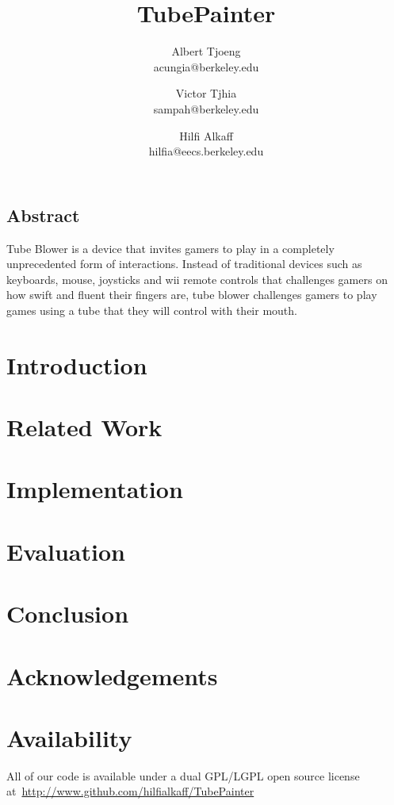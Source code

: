 \documentclass[letterpaper,twocolumn,11pt]{article}
\begin{document}
\date{}

\title{\Large \bf TubePainter}

\author{
{\rm Albert Tjoeng}\\
acungia@berkeley.edu
\and
{\rm Victor Tjhia}\\
sampah@berkeley.edu
\and
{\rm Hilfi Alkaff}\\
hilfia@eecs.berkeley.edu
} %

\maketitle


\subsection*{Abstract}
Tube Blower is a device that invites gamers to play in a completely unprecedented form of interactions. Instead of traditional devices such as keyboards, mouse, joysticks and wii remote controls that challenges gamers on how swift and fluent their fingers are, tube blower challenges gamers to play games using a tube that they will control with their mouth.

\section{Introduction}

\section{Related Work}

\section{Implementation}

\section{Evaluation}

\section{Conclusion}

\section{Acknowledgements}

\section{Availability}

All of our code is available under a dual GPL/LGPL open source license at~\url{http://www.github.com/hilfialkaff/TubePainter}

\footnotesize{
}

\end{document}
